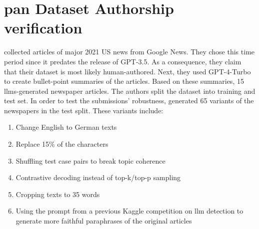 \section{\acs{pan} Dataset Authorship verification}
\label{sec:pan_dataset_authorship_verification}

\citet{ayele_overview_2024} collected articles of major 2021 US news from Google News.
They chose this time period since it predates the release of GPT-3.5.
As a consequence, they claim that their dataset is most likely human-authored.
Next, they used GPT-4-Turbo to create bullet-point summaries of the articles. 
Based on these summaries, 15 \acp{llm}-generated newspaper articles.
The authors split the dataset into training and test set.
In order to test the submissions' robustness, \citet{ayele_overview_2024} generated 65 variants of the newspapers in the test split.
These variants include:
\begin{enumerate}
    \item Change English to German texts
    \item Replace 15\% of the characters
    \item Shuffling test case pairs to break topic coherence 
    \item Contrastive decoding instead of top-k/top-p sampling
    \item Cropping texts to 35 words
    \item Using the prompt from a previous Kaggle competition on \ac{llm} detection to generate more faithful paraphrases of the original articles
\end{enumerate}